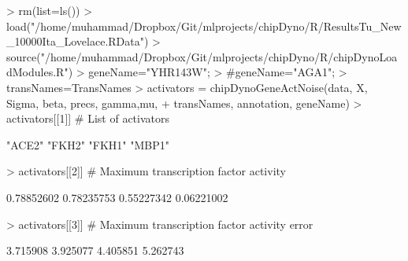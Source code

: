 \documentclass{article}
\begin{document}
\begin{Schunk}
\begin{Sinput}
> rm(list=ls())
> load("/home/muhammad/Dropbox/Git/mlprojects/chipDyno/R/ResultsTu_New_10000Ita_Lovelace.RData")
> source("/home/muhammad/Dropbox/Git/mlprojects/chipDyno/R/chipDynoLoadModules.R")
> geneName="YHR143W"; 
> #geneName="AGA1"; 
> transNames=TransNames
> activators = chipDynoGeneActNoise(data, X, Sigma, beta, precs, gamma,mu, 
+                     transNames, annotation, geneName)
> activators[[1]] # List of activators
\end{Sinput}
\begin{Soutput}
[1] "ACE2" "FKH2" "FKH1" "MBP1"
\end{Soutput}
\begin{Sinput}
> activators[[2]] # Maximum transcription factor activity
\end{Sinput}
\begin{Soutput}
[1] 0.78852602 0.78235753 0.55227342 0.06221002
\end{Soutput}
\begin{Sinput}
> activators[[3]] # Maximum transcription factor activity error
\end{Sinput}
\begin{Soutput}
[1] 3.715908 3.925077 4.405851 5.262743
\end{Soutput}
\end{Schunk}




\end{document}
